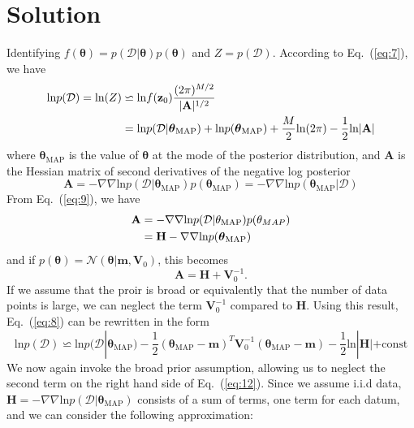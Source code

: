 \documentclass{article}
\begin{document}
	\section{Solution}
	Identifying $f(\boldsymbol{\theta}) = p(\mathcal{D}|\boldsymbol{\theta})p(\boldsymbol{\theta})$ and $Z = p(\mathcal{D})$. According to Eq.~(\ref{eq:7}), we have
	\begin{align}
	\text{ln}p(\mathcal{D}) = \text{ln}(Z) &\backsimeq \text{ln}f(\mathbf{z}_0)\frac{(2\pi)^{M/2}}{|\mathbf{A}|^{1/2}}\notag\\ 
	&= \text{ln}p(\mathcal{D}|\boldsymbol{\theta}_{\text{MAP}}) + \text{ln}p(\boldsymbol{\theta}_{\text{MAP}}) + \frac{M}{2}\text{ln}(2\pi) - \frac{1}{2}\text{ln}|\mathbf{A}|\label{eq:8}
	\end{align}
	where $\boldsymbol{\theta}_{\text{MAP}}$ is the value of $\boldsymbol{\theta}$ at the mode of the posterior distribution, and $\mathbf{A}$ is the Hessian matrix of second derivatives of the negative log posterior
	\begin{equation}
	\mathbf{A} = -\nabla\nabla\text{ln}p(\mathcal{D}|\boldsymbol{\theta}_\text{MAP})p(\boldsymbol{\theta}_{\text{MAP}})=-\nabla\nabla\text{ln}p(\boldsymbol{\theta}_{\text{MAP}}|\mathcal{D}) \label{eq:9}
	\end{equation}
	From Eq.~(\ref{eq:9}), we have 
	\begin{align}
	\mathbf{A} &= -\nabla\nabla\text{ln}p(\mathcal{D}|\mathbf{\theta}_{\text{MAP}})p(\theta_{MAP})\notag\\
	&= \mathbf{H} - \nabla\nabla\text{ln}p(\boldsymbol{\theta}_{\text{MAP}})
	\end{align}
	and if $p(\boldsymbol{\theta}) = \mathcal{N}(\boldsymbol{\theta}|\mathbf{m},\mathbf{V}_0)$, this becomes
	\begin{equation}
	\mathbf{A} = \mathbf{H} + \mathbf{V}_0^{-1}.
	\end{equation} 
	If we assume that the proir is broad or equivalently that the number of data points is large, we can neglect the term $\mathbf{V}_0^{-1}$ compared to $\mathbf{H}$. 
	Using this result, Eq.~(\ref{eq:8}) can be rewritten in the form
	\begin{equation}
	\text{ln}p(\mathcal{D}) \backsimeq \text{ln}p(\mathcal{D}|\boldsymbol{\theta}_{\text{MAP}})-\frac{1}{2}(\boldsymbol{\theta}_{\text{MAP}}-\mathbf{m})^T\mathbf{V}_0^{-1}(\boldsymbol{\theta}_{\text{MAP}}-\mathbf{m})-\frac{1}{2}\text{ln}|\mathbf{H}|+\text{const}\label{eq:12}
	\end{equation}
	We now again invoke the broad prior assumption, allowing us to neglect the second term on the right hand side of Eq.~(\ref{eq:12}). Since we assume i.i.d data, $\mathbf{H}=-\nabla\nabla\text{ln}p(\mathcal{D}|\boldsymbol{\theta}_{\text{MAP}})$ consists of a sum of terms, one term for each datum, and we can consider the following approximation:
\end{document}
